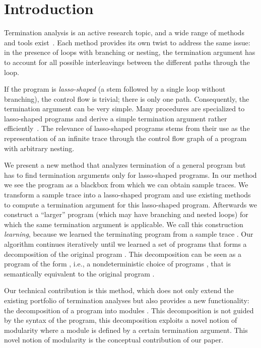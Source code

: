 \section{Introduction}
 
Termination analysis is an active research topic, and a wide range of methods and tools exist~\cite{pldi/CookPR06,conf/tacas/CookSZ13,sas/HarrisLNR10,cav/KroeningSTW10,cav/LeeWY12,tacas/PopeeaR12,conf/esop/UrbanM14}. Each method provides its own twist to address the same issue: in the presence of loops with branching or nesting, the termination argument has to account for all possible interleavings between the different paths through the loop. 

If the program is \emph{lasso-shaped} (a stem followed by a single loop without branching), the control flow is trivial; there is only one path.
Consequently, the termination argument can be very simple.  Many procedures are specialized to lasso-shaped programs and derive a simple termination argument rather efficiently~\cite{cav/Ben-Amram09,popl/Ben-AmramG13,cav/BradleyMS05,tacas/CookKRW10,conf/atva/HeizmannHLP13,conf/tacas/LeikeH14,vmcai/PodelskiR04}. The relevance of lasso-shaped programs stems from their use as the representation of an infinite trace through the control flow graph of a program with arbitrary nesting.



We present a new method that analyzes termination of a general program  but has to find termination arguments only for lasso-shaped programs.
In our method we see the program  as a blackbox from which we can obtain sample traces. 
We transform a sample trace  into a lasso-shaped program and use existing methods to compute a termination argument for this lasso-shaped program.  
Afterwards we construct a ``larger'' program  (which may have branching and nested loops) for which the same termination argument is applicable.
We call this construction \emph{learning}, because we learned the terminating program  from a sample trace .
Our algorithm continues iteratively until we learned a set of programs  that forms a decomposition of the original program .
This decomposition can be seen as a program of the form , i.e., a nondeterministic choice of programs , that is semantically equivalent to the original program .


Our technical contribution is this method, which does not only extend the existing portfolio of termination analyses but also provides a new functionality: the decomposition of a program  into modules .  
This decomposition is not guided by the syntax of the program, this decomposition exploits a novel notion of modularity where a module is defined by a certain termination argument. This novel notion of modularity is the conceptual contribution of our paper.




